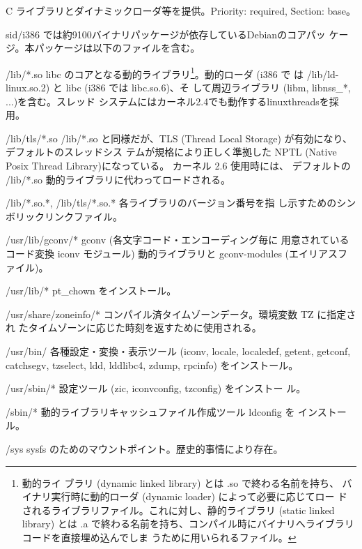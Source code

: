 \documentclass[mingoth]{jsarticle}
\newenvironment{gdescription}%
{%
   \begin{list}{}%
   {%
      \setlength{\itemindent}{0mm}
      \setlength{\leftmargin}{45mm}%
      \setlength{\rightmargin}{0zw}%
      \setlength{\labelsep}{4mm}%
      \setlength{\labelwidth}{4cm}%
      \setlength{\itemsep}{0em}%
      \setlength{\parsep}{0cm}%
      \setlength{\listparindent}{0cm}%
      \let\makelabel\gdescriptionlabel
   }
}{%
   \end{list}%
}
\newcommand*\gdescriptionlabel[1]{\hspace\labelsep\normalfont\bfseries #1}
\begin{document}
    C ライブラリとダイナミックローダ等を提供。Priority: required,
    Section: base。

    sid/i386 では約9100バイナリパッケージが依存しているDebianのコアパッ
    ケージ。本パッケージは以下のファイルを含む。

    \begin{gdescription}

    \item[/lib/*.so] libc のコアとなる動的ライブラリ\footnote{動的ライ
        ブラリ (dynamic linked library) とは .so で終わる名前を持ち、
        バイナリ実行時に動的ローダ (dynamic loader) によって必要に応じてロー
        ドされるライブラリファイル。これに対し、静的ライブラリ (static linked library) 
        とは .a で終わる名前を持ち、コンパイル時にバイナリへライブラリコードを直接埋め込んでしま
        うために用いられるファイル。}。動的ローダ (i386 で
    	       は /lib/ld-linux.so.2) と libc (i386 では libc.so.6)、そ
	       して周辺ライブラリ (libm, libnss\_*, ...)を含む。スレッド
	       システムにはカーネル2.4でも動作するlinuxthreadsを採用。
    \item[/lib/tls/*.so] /lib/*.so と同様だが、TLS (Thread Local
	       Storage) が有効になり、デフォルトのスレッドシス
	       テムが規格により正しく準拠した NPTL (Native Posix Thread Library)になっている。
	       カーネル 2.6 使用時には、
	       デフォルトの /lib/*.so 動的ライブラリに代わってロードされる。
    \item[/lib/*.so.*, /lib/tls/*.so.*] 各ライブラリのバージョン番号を指
	       し示すためのシンボリックリンクファイル。
    \item[/usr/lib/gconv/*] gconv (各文字コード・エンコーディング毎に
	       用意されているコード変換 iconv モジュール) 動的ライブラリと gconv-modules (エイリアスファイル)。
    \item[/usr/lib/*] pt\_chown をインストール。
    \item[/usr/share/zoneinfo/*] コンパイル済タイムゾーンデータ。環境変数 TZ に指定され
	       たタイムゾーンに応じた時刻を返すために使用される。
    \item[/usr/bin/] 各種設定・変換・表示ツール (iconv, locale,
	       localedef, getent, getconf, catchsegv, tzselect, ldd,
	       lddlibc4, zdump, rpcinfo) をインストール。
    \item[/usr/sbin/*] 設定ツール (zic, iconvconfig, tzconfig) をインストー
	       ル。
    \item[/sbin/*] 動的ライブラリキャッシュファイル作成ツール ldconfig を
	       インストール。
    \item[/sys] sysfs のためのマウントポイント。歴史的事情により存在。
    \end{gdescription}
\end{document}
